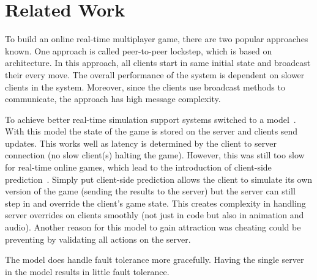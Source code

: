 
\section{Related Work}

To build an online real-time multiplayer game, there are two popular approaches known. One approach is called peer-to-peer lockstep, which is based on \ptoP architecture. In this approach, all clients start in same initial state and broadcast their every move. The overall performance of the system is dependent on slower clients in the system. Moreover, since the clients use broadcast methods to communicate, the approach has high message complexity.

To achieve better real-time simulation support systems switched to a \clientServer model~\cite{DOOMfaq}. With this model the state of the game is stored on the server and clients send updates. This works well as latency is determined by the client to server connection (no slow client(s) halting the game). However, this was still too slow for real-time online games, which lead to the introduction of client-side prediction~\cite{bernier2001latency}. Simply put client-side prediction allows the client to simulate its own version of the game (sending the results to the server) but the server can still step in and override the client's game state. This creates complexity in handling server overrides on clients smoothly (not just in code but also in animation and audio). Another reason for this model to gain attraction was cheating could be preventing by validating all actions on the server.

The \ptoP model does handle fault tolerance more gracefully. Having the single server in the \clientServer model results in little fault tolerance.
